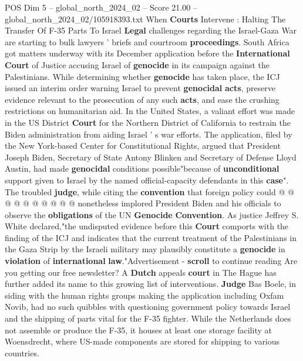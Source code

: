 \begin{textsample}{POS Dim 5 – global\_north\_2024\_02 – Score 21.00 – global\_north\_2024\_02/105918393.txt}  \label{ex:f5_pos_243}
When \textbf{Courts} Intervene : Halting The Transfer Of F-35 Parts To Israel \textbf{Legal} challenges regarding the Israel-Gaza War are starting to bulk lawyers ' briefs and courtroom \textbf{proceedings}.
South Africa got matters underway with its December application before the \textbf{International} \textbf{Court} of Justice accusing Israel of \textbf{genocide} in its campaign against the Palestinians.
While determining whether \textbf{genocide} has taken place, the ICJ issued an interim order warning Israel to prevent \textbf{genocidal} \textbf{acts}, preserve evidence relevant to the prosecution of any such \textbf{acts}, and ease the crushing restrictions on humanitarian aid.
In the United States, a valiant effort was made in the US District \textbf{Court} for the Northern District of California to restrain the Biden administration from aiding Israel ' s war efforts.
The application, filed by the New York-based Center for Constitutional Rights, argued that President Joseph Biden, Secretary of State Antony Blinken and Secretary of Defense Lloyd Austin, had made \textbf{genocidal} conditions possible"because of \textbf{unconditional} support given to Israel by the named official-capacity defendants in this \textbf{case}".
The troubled \textbf{judge}, while citing the \textbf{convention} that foreign policy could @ @ @ @ @ @ @ @ @ @ nonetheless implored President Biden and his officials to observe the \textbf{obligations} of the UN \textbf{Genocide} \textbf{Convention}.
As justice Jeffrey S.
White declared,"the undisputed evidence before this \textbf{Court} comports with the finding of the ICJ and indicates that the current treatment of the Palestinians in the Gaza Strip by the Israeli military may plausibly constitute a \textbf{genocide} in \textbf{violation} of \textbf{international} \textbf{law}."Advertisement - \textbf{scroll} to continue reading Are you getting our free newsletter?
A \textbf{Dutch} appeals \textbf{court} in The Hague has further added its name to this growing list of interventions. \textbf{Judge} Bas Boele, in siding with the human rights groups making the application including Oxfam Novib, had no such quibbles with questioning government policy towards Israel and the shipping of parts vital for the F-35 fighter.
While the Netherlands does not assemble or produce the F-35, it houses at least one storage facility at Woensdrecht, where US-made components are stored for shipping to various countries.

\end{textsample}
